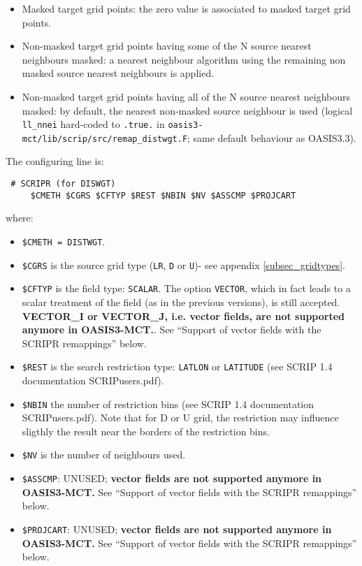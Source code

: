 \begin{itemize}
\begin{itemize}
\begin{itemize}
    \item Masked target grid points: the zero value is associated to
      masked target grid points.

    \item Non-masked target grid points having some of the N source
      nearest neighbours masked: a nearest neighbour algorithm using
      the remaining non masked source nearest neighbours is applied.

    \item Non-masked target grid points having all of the N source
      nearest neighbours masked: by default, the nearest non-masked
      source neighbour is used (logical {\tt ll\_nnei} hard-coded to
      {\tt .true.} in {\tt oasis3-mct/lib/scrip/src/remap\_distwgt.F};
      same default behaviour as OASIS3.3).

    \end{itemize}

    The configuring line is:

  \begin{verbatim}
 # SCRIPR (for DISWGT) 
     $CMETH $CGRS $CFTYP $REST $NBIN $NV $ASSCMP $PROJCART
\end{verbatim} 
    where:
    \begin{itemize}
    \item {\tt \$CMETH = DISTWGT}.
    \item {\tt \$CGRS} is the source grid type ({\tt LR}, {\tt D} or
      {\tt U})- see appendix \ref{subsec_gridtypes}.

    \item {\tt \$CFTYP} is the field type: {\tt SCALAR}. The option
      {\tt VECTOR}, which in fact leads to a scalar treatment of the
      field (as in the previous versions), is still accepted. {\bf
        VECTOR\_I or VECTOR\_J, i.e. vector fields, are not supported
        anymore in OASIS3-MCT.}. See ``Support of vector fields with
      the SCRIPR remappings'' below.

    \item {\tt \$REST} is the search restriction type: {\tt LATLON} or
      {\tt LATITUDE} (see SCRIP 1.4 documentation SCRIPusers.pdf).
    \item {\tt \$NBIN} the number of restriction bins (see SCRIP 1.4
      documentation SCRIPusers.pdf). Note that for D or U grid, the
      restriction may influence sligthly the result near the borders
      of the restriction bins.
    \item {\tt \$NV} is the number of neighbours used.
    \item {\tt \$ASSCMP}: UNUSED; {\bf vector fields are not supported
        anymore in OASIS3-MCT.} See ``Support of vector fields with
      the SCRIPR remappings'' below.
    \item {\tt \$PROJCART}: UNUSED; {\bf vector fields are not
        supported anymore in OASIS3-MCT.} See ``Support of vector
      fields with the SCRIPR remappings'' below.
    \end{itemize}


\end{itemize}
\end{itemize}

